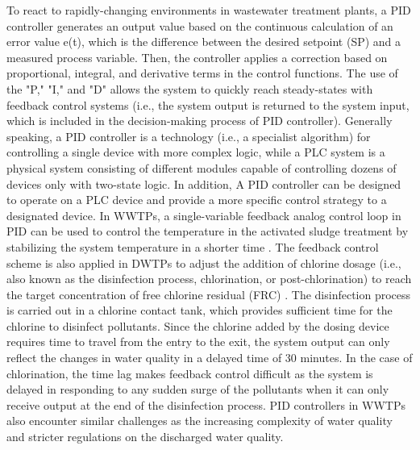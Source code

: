 To react to rapidly-changing environments in wastewater treatment plants, a PID controller generates an output value based on the continuous calculation of an error value e(t), which is the difference between the desired setpoint (SP) and a measured process variable. Then, the controller applies a correction based on proportional, integral, and derivative terms in the control functions. The use of the "P," "I," and "D" allows the system to quickly reach steady-states with feedback control systems (i.e., the system output is returned to the system input, which is included in the decision-making process of PID controller). Generally speaking, a PID controller is a technology (i.e., a specialist algorithm) for controlling a single device with more complex logic, while a PLC system is a physical system consisting of different modules capable of controlling dozens of devices only with two-state logic. In addition, A PID controller can be designed to operate on a PLC device and provide a more specific control strategy to a designated device. In WWTPs, a single-variable feedback analog control loop in PID can be used to control the temperature in the activated sludge treatment by stabilizing the system temperature in a shorter time \citep{badosDesignPIDControl2020}. The feedback control scheme is also applied in DWTPs to adjust the addition of chlorine dosage (i.e., also known as the disinfection process, chlorination, or post-chlorination) to reach the target concentration of free chlorine residual (FRC) \citep{wangCompositeControlPostChlorine2019}. The disinfection process is carried out in a chlorine contact tank, which provides sufficient time for the chlorine to disinfect pollutants. Since the chlorine added by the dosing device requires time to travel from the entry to the exit, the system output can only reflect the changes in water quality in a delayed time of 30 minutes. In the case of chlorination, the time lag makes feedback control difficult \citep{kobylinskiLineControlStrategies2006} as the system is delayed in responding to any sudden surge of the pollutants when it can only receive output at the end of the disinfection process. PID controllers in WWTPs also encounter similar challenges as the increasing complexity of water quality and stricter regulations on the discharged water quality. 


